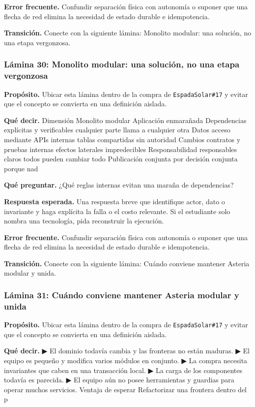 \documentclass[variant=docente,cover=institutional,mode=screen]{ua-engineering-v6-article}
\begin{document}
\textbf{Error frecuente.} Confundir separación física con autonomía o suponer que una flecha de red elimina la necesidad de estado durable e idempotencia.

\textbf{Transición.} Conecte con la siguiente lámina: Monolito modular: una solución, no una etapa vergonzosa.

\subsubsection*{Lámina 30: Monolito modular: una solución, no una etapa vergonzosa}
\textbf{Propósito.} Ubicar esta lámina dentro de la compra de \texttt{EspadaSolar\#17} y evitar que el concepto se convierta en una definición aislada.

\textbf{Qué decir.} Dimensión Monolito modular Aplicación enmarañada Dependencias explícitas y verificables cualquier parte llama a cualquier otra Datos acceso mediante APIs internas tablas compartidas sin autoridad Cambios contratos y pruebas internas efectos laterales impredecibles Responsabilidad responsables claros todos pueden cambiar todo Publicación conjunta por decisión conjunta porque nad

\textbf{Qué preguntar.} ¿Qué reglas internas evitan una maraña de dependencias?

\textbf{Respuesta esperada.} Una respuesta breve que identifique actor, dato o invariante y haga explícita la falla o el costo relevante. Si el estudiante solo nombra una tecnología, pida reconstruir la ejecución.

\textbf{Error frecuente.} Confundir separación física con autonomía o suponer que una flecha de red elimina la necesidad de estado durable e idempotencia.

\textbf{Transición.} Conecte con la siguiente lámina: Cuándo conviene mantener Asteria modular y unida.

\subsubsection*{Lámina 31: Cuándo conviene mantener Asteria modular y unida}
\textbf{Propósito.} Ubicar esta lámina dentro de la compra de \texttt{EspadaSolar\#17} y evitar que el concepto se convierta en una definición aislada.

\textbf{Qué decir.} ▶ El dominio todavía cambia y las fronteras no están maduras. ▶ El equipo es pequeño y modifica varios módulos en conjunto. ▶ La compra necesita invariantes que caben en una transacción local. ▶ La carga de los componentes todavía es parecida. ▶ El equipo aún no posee herramientas y guardias para operar muchos servicios. Ventaja de esperar Refactorizar una frontera dentro del p
\end{document}
